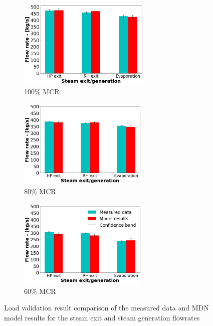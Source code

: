 \documentclass[a4paper,fleqn]{cas-sc}
\begin{document}
\begin{figure}
\centering
\begin{subfigure}{0.33\textwidth}
\includegraphics[width=\linewidth, height = 4.25cm]{100_CASE_STEAM}
        \caption{100\% MCR}
\end{subfigure}\hfill %
\begin{subfigure}{0.33\textwidth}
    \includegraphics[width=\linewidth, height = 4.25cm]{80_CASE_STEAM}
    \caption{80\% MCR}
\end{subfigure}\hfill
\begin{subfigure}{0.33\textwidth}
	\includegraphics[width=\linewidth, height = 4.25cm]{60_CASE_STEAM}
    \caption{60\% MCR}
\end{subfigure}
\caption{Load validation result comparison of the measured data and MDN model results for the steam exit and  steam generation flowrates}
\label{fig_steam_gen}
\end{figure}
\end{document}
